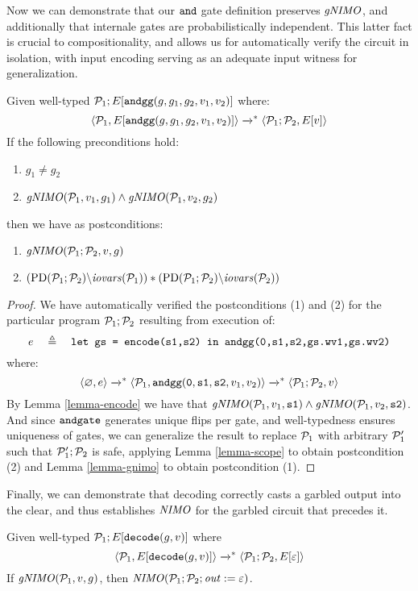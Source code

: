 Now we can demonstrate that our $\texttt{and}$ gate definition preserves
$\mathit{gNIMO}$, and additionally that internale gates are probabilistically independent.
This latter fact is crucial to compositionality, and allows us for automatically
verify the circuit in isolation, with input encoding serving as an adequate input
witness for generalization. 
\begin{lemma}
  \label{lemma-compose}
Given well-typed $\mathcal{P}_1;E[\texttt{andgg}(g,g_1,g_2,v_1,v_2)]$ where:
$$
\langle \mathcal{P}_1,E[\texttt{andgg}(g,g_1,g_2,v_1,v_2)] \rangle \xrightarrow{}^{*} \langle \mathcal{P}_1;\mathcal{P}_2,E[v] \rangle
$$
If the following preconditions hold:
\begin{enumerate}
\item $g_1 \ne g_2$
\item $\mathit{gNIMO}(\mathcal{P}_1,v_1,g_1) \wedge \mathit{gNIMO}(\mathcal{P}_1,v_2,g_2)$ 
\end{enumerate}
then we have as postconditions:
\begin{enumerate}
  \item $\mathit{gNIMO}(\mathcal{P}_1;\mathcal{P}_2,v,g)$
  \item $(\mathrm{PD}(\mathcal{P}_1;\mathcal{P}_2)\backslash\mathit{iovars}(\mathcal{P}_1)) * (\mathrm{PD}(\mathcal{P}_1;\mathcal{P}_2)\backslash\mathit{iovars}(\mathcal{P}_2))$
\end{enumerate}
\end{lemma}
\begin{proof}
  We have automatically verified the postconditions (1) and (2) for the particular
  program $\mathcal{P}_1;\mathcal{P}_2$ resulting from execution of:
  $$e\quad \triangleq\quad \texttt{let gs = encode(s1,s2) in andgg(0,s1,s2,gs.wv1,gs.wv2)}$$
  where:
  $$
  \langle \varnothing,e \rangle \xrightarrow{}^{*}
  \langle \mathcal{P}_1,\texttt{andgg}(\texttt{0},\texttt{s1},\texttt{s2},v_1,v_2) \rangle \xrightarrow{}^{*} \langle \mathcal{P}_1;\mathcal{P}_2,v \rangle
  $$
  By Lemma \ref{lemma-encode} we have that
  $\mathit{gNIMO}(\mathcal{P}_1,v_1,\texttt{s1}) \wedge \mathit{gNIMO}(\mathcal{P}_1,v_2,\texttt{s2})$. 
  And since $\texttt{andgate}$ generates unique flips per gate, and well-typedness ensures
  uniqueness of gates, we can generalize the result to replace $\mathcal{P}_1$ with arbitrary $\mathcal{P}_1'$
  such that $\mathcal{P}_1';\mathcal{P}_2$ is safe,
  applying Lemma \ref{lemma-scope} to obtain postcondition (2) and Lemma \ref{lemma-gnimo}
  to obtain postcondition (1). 
\end{proof}
Finally, we can demonstrate that decoding correctly casts a garbled output into the
clear, and thus establishes $\mathit{NIMO}$ for the garbled circuit that precedes it.
\begin{lemma}[Decoding]
  \label{lemma-decode}
Given well-typed $\mathcal{P}_1;E[\texttt{decode}(g,v)]$ where
$$
\langle \mathcal{P}_1,E[\texttt{decode}(g,v)] \rangle \xrightarrow{}^{*} \langle \mathcal{P}_1;\mathcal{P}_2,E[\varepsilon] \rangle
$$
If $\mathit{gNIMO}(\mathcal{P}_1,v,g)$, then $\mathit{NIMO}(\mathcal{P}_1;\mathcal{P}_2;\mathit{out} := \varepsilon)$.
\end{lemma}
